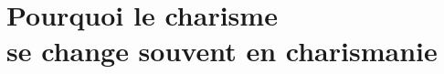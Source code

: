 \chapter[Pourquoi le charisme se change souvent en charismanie]{Pourquoi le charisme\\ se change souvent en charismanie}
\renewcommand{\chaphead}{Pourquoi le charisme se change souvent\dots{}}


\closechapter
